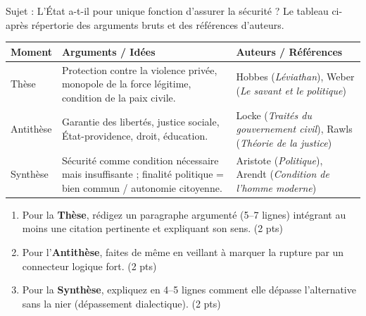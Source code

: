 \documentclass[11pt]{article}
\begin{document}
\begin{exercice}
Sujet : \og L'État a-t-il pour unique fonction d'assurer la sécurité ? \fg{} Le tableau ci-après répertorie des arguments bruts et des références d'auteurs.
\begin{center}
\begin{tabularx}{\linewidth}{>{\hsize=1.2\hsize}X>{\hsize=1.5\hsize}X>{\hsize=1.3\hsize}X}
\textbf{Moment} & \textbf{Arguments / Idées} & \textbf{Auteurs / Références} \\
\hline
Thèse & Protection contre la violence privée, monopole de la force légitime, condition de la paix civile. & Hobbes (\textit{Léviathan}), Weber (\textit{Le savant et le politique}) \\
Antithèse & Garantie des libertés, justice sociale, État-providence, droit, éducation. & Locke (\textit{Traités du gouvernement civil}), Rawls (\textit{Théorie de la justice}) \\
Synthèse & Sécurité comme condition nécessaire mais insuffisante ; finalité politique = bien commun / autonomie citoyenne. & Aristote (\textit{Politique}), Arendt (\textit{Condition de l'homme moderne}) \\
\end{tabularx}
\end{center}
\begin{enumerate}
    \item Pour la \textbf{Thèse}, rédigez un paragraphe argumenté (5--7 lignes) intégrant au moins une citation pertinente et expliquant son sens. (2 pts)
    \item Pour l'\textbf{Antithèse}, faites de même en veillant à marquer la rupture par un connecteur logique fort. (2 pts)
    \item Pour la \textbf{Synthèse}, expliquez en 4--5 lignes comment elle dépasse l'alternative sans la nier (dépassement dialectique). (2 pts)
\end{enumerate}
\end{exercice}
\end{document}
